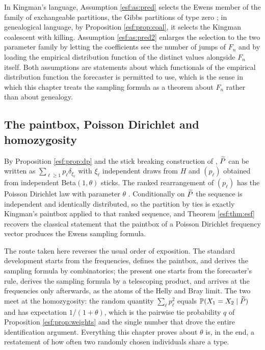 In Kingman's language, Assumption \ref{esf:as:pred} selects the Ewens member of the family
of exchangeable partitions, the Gibbs partitions of type zero \citep{esf:gnedin2006}; in genealogical language, by
Proposition \ref{esf:prop:coal}, it selects the Kingman coalescent with killing.
Assumption
\ref{esf:as:pred2} enlarges the selection to the two parameter family by letting the
coefficients see the number of jumps of $F_n$ and by loading the empirical
distribution function of the distinct values alongside $F_n$ itself. Both assumptions
are statements about which functionals of the empirical distribution function the
forecaster is permitted to use, which is the sense in which this chapter treats the
sampling formula as a theorem about $F_n$ rather than about genealogy.

\subsection{The paintbox, Poisson Dirichlet and homozygosity}

By Proposition \ref{esf:prop:dp} and the stick breaking construction of \citet{esf:sethuraman1994}, $\widetilde{P}$ can
be written as $\sum_{\ell \ge 1} p_\ell \delta_{\xi_\ell}$ with $\xi_\ell$ independent
draws from $H$ and $(p_\ell)$ obtained from independent Beta$(1,\theta)$ sticks. The
ranked rearrangement of $(p_\ell)$ has the Poisson Dirichlet law with parameter
$\theta$ \citep{esf:pitman2006}. Conditionally on $\widetilde{P}$ the sequence is independent and identically
distributed, so the partition by ties is exactly Kingman's paintbox applied to that
ranked sequence, and Theorem \ref{esf:thm:esf} recovers the classical statement that the
paintbox of a Poisson Dirichlet frequency vector produces the Ewens sampling formula.

The route taken here reverses the usual order of exposition. The standard development
starts from the frequencies, defines the paintbox, and derives the sampling formula by
combinatorics; the present one starts from the forecaster's rule, derives the sampling
formula by a telescoping product, and arrives at the frequencies only afterwards, as
the atoms of the Helly and Bray limit. The two meet at the homozygosity: the random
quantity $\sum_\ell p_\ell^2$ equals $\mathbb{P}(X_1 = X_2 \mid \widetilde{P})$ and has expectation
$1/(1+\theta)$, which is the pairwise tie probability $q$ of Proposition
\ref{esf:prop:weights} and the single number that drove the entire identification
argument. Everything this chapter proves about $\theta$ is, in the end, a restatement of
how often two randomly chosen individuals share a type.


